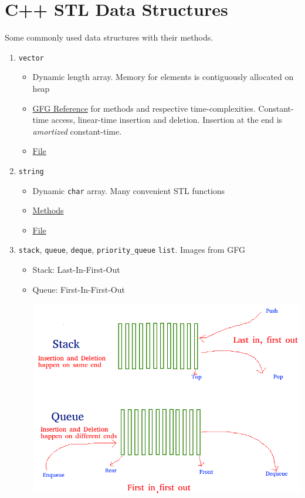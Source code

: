 \documentclass{article}
\newcommand{\I}[1]{\textit{#1}}
\newcommand{\T}[1]{\texttt{#1}}
\begin{document}
\begin{sloppypar}
    \newpage

    \section{C++ STL Data Structures}

    Some commonly used data structures with their methods.
    \begin{enumerate}
        \item \T{vector}
        \begin{itemize}
            \item Dynamic length array. Memory for elements is contiguously allocated on heap
            \item \href{https://www.geeksforgeeks.org/vector-in-cpp-stl/}{GFG Reference} for methods and respective time-complexities. Constant-time access, linear-time insertion and deletion. Insertion at the end is \I{amortized} constant-time.
            \item \href{run:../programs/2_vector.cpp}{File}
        \end{itemize}
        \item \T{string}
        \begin{itemize}
            \item Dynamic \T{char} array. Many convenient STL functions
            \item \href{https://www.geeksforgeeks.org/stdstring-class-in-c/}{Methods}
            \item \href{run:../programs/3_string.cpp}{File}
        \end{itemize}
        \item \T{stack}, \T{queue}, \T{deque}, \T{priority\_queue} \T{list}. Images from GFG
        \begin{itemize}
            \item Stack: Last-In-First-Out
            \item Queue: First-In-First-Out
            \begin{center}
                \includegraphics[width = 0.9\linewidth]{../images/1_Stack-Queue.png}

\end{center}
\end{itemize}
\end{enumerate}
\end{sloppypar}
\end{document}
